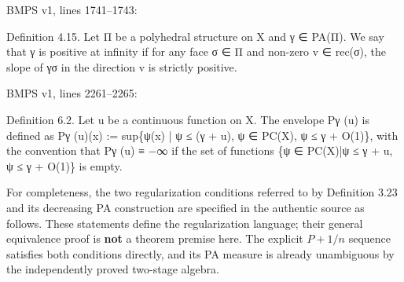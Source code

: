 \documentclass[
  11pt,
]{article}
\newenvironment{Shaded}{}{}
\newcommand{\NormalTok}[1]{#1}
\begin{document}
BMPS v1, lines 1741--1743:

\begin{Shaded}
\begin{Highlighting}[]
\NormalTok{Definition 4.15. Let Π be a polyhedral structure on X and γ ∈ PA(Π). We say that γ is positive}
\NormalTok{at infinity if for any face σ ∈ Π and non{-}zero v ∈ rec(σ), the slope of γσ in the direction v is strictly}
\NormalTok{positive.}
\end{Highlighting}
\end{Shaded}

BMPS v1, lines 2261--2265:

\begin{Shaded}
\begin{Highlighting}[]
\NormalTok{Definition 6.2. Let u be a continuous function on X. The envelope Pγ (u) is defined as}
\NormalTok{                   Pγ (u)(x) := sup\{ψ(x) | ψ ≤ (γ + u), ψ ∈ PC(X), ψ ≤ γ + O(1)\},}
\NormalTok{with the convention that Pγ (u) ≡ −∞ if the set of functions \{ψ ∈ PC(X)|ψ ≤ γ + u, ψ ≤ γ + O(1)\}}
\NormalTok{is empty.}
\end{Highlighting}
\end{Shaded}

For completeness, the two regularization conditions referred to by
Definition 3.23 and its decreasing PA construction are specified in the
authentic source as follows. These statements define the regularization
language; their general equivalence proof is \textbf{not} a theorem
premise here. The explicit \(P+1/n\) sequence satisfies both conditions
directly, and its PA measure is already unambiguous by the independently
proved two-stage algebra.
\end{document}
